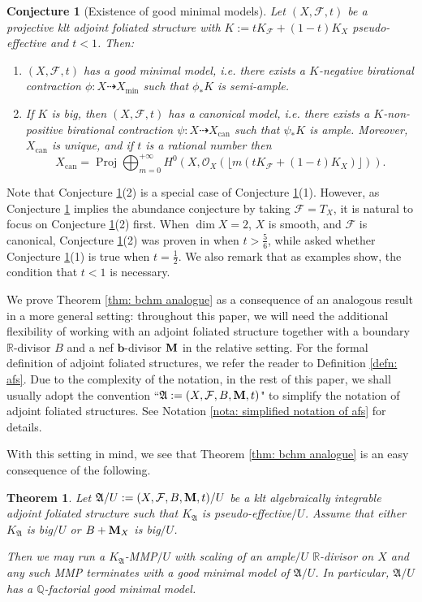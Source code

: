 \documentclass[12pt]{amsart}
\numberwithin{equation}{section}
\newcommand{\bb}{\bm{b}}
\newcommand{\Mm}{{\bf{M}}}
\newcommand{\Rr}{\mathbb{R}}
\newcommand{\Proj}{{\operatorname{Proj}}}
\newcommand{\can}{{\operatorname{can}}}
\newcommand{\Aa}{{\mathfrak{A}}}
\newcommand{\Ff}{\mathcal{F}}
\newtheorem{thmsub}{Theorem}[subsection]
\newtheorem{conj}[thm]{Conjecture}
\theoremstyle{definition}
\theoremstyle{definition}
\theoremstyle{definition}
\begin{document}
\begin{conj}[Existence of good minimal models]\label{conj: eogmm afs}
    Let $(X,\Ff,t)$ be a projective klt adjoint foliated structure with $K:=tK_{\Ff}+(1-t)K_X$ pseudo-effective and $t<1$.
    Then:
    \begin{enumerate}
        \item $(X,\Ff,t)$ has a good minimal model, i.e. there exists a $K$-negative birational contraction $\phi\colon X\dashrightarrow X_{\min}$ such that $\phi_*K$ is semi-ample.
        \item If $K$ is big, then $(X,\Ff,t)$ has a canonical model, i.e. there exists a $K$-non-positive birational contraction $\psi\colon X\dashrightarrow X_{\can}$ such that $\psi_*K$ is ample. Moreover, $X_{\can}$ is unique, and if $t$ is a rational number then $$X_{\can}=\Proj\bigoplus_{m=0}^{+\infty}H^0(X,\mathcal O_X(\lfloor m(tK_{\Ff}+(1-t)K_X)\rfloor)).$$
    \end{enumerate}
\end{conj}
Note that Conjecture \ref{conj: eogmm afs}(2) is a special case of Conjecture \ref{conj: eogmm afs}(1). However, as Conjecture \ref{conj: eogmm afs} implies the abundance conjecture by taking $\Ff=T_X$, it is natural to focus on Conjecture \ref{conj: eogmm afs}(2) first. When $\dim X=2$, $X$ is smooth, and $\Ff$ is canonical, Conjecture \ref{conj: eogmm afs}(2) was proven in \cite[Theorem 1.2]{SS23} when $t>\frac{5}{6}$, while \cite[Problem 1.9]{LW24} asked whether Conjecture \ref{conj: eogmm afs}(1) is true when $t=\frac{1}{2}$.  We also remark that as examples show, the condition that $t<1$ is necessary. 


We prove Theorem \ref{thm: bchm analogue} as a consequence of an analogous result in a more general setting:
throughout this paper, we will need the additional flexibility of working with an adjoint foliated structure together with a boundary $\Rr$-divisor $B$ and a nef $\bb$-divisor $\Mm$ in the relative setting. For the formal definition of adjoint foliated structures, we refer the reader to Definition \ref{defn: afs}. Due to the complexity of the notation, in the rest of this paper, we shall usually adopt the convention ``$\Aa:=(X,\Ff,B,\Mm,t)$" to simplify the notation of adjoint foliated structures. See Notation \ref{nota: simplified notation of afs} for details.


With this setting in mind, we see that Theorem \ref{thm: bchm analogue} is an easy consequence of the following.

\begin{thmsub}\label{thm: eogmm ai afs general case}
    Let $\Aa/U:=(X,\Ff,B,\Mm,t)/U$ be a klt algebraically integrable adjoint foliated structure such that $K_{\Aa}$ is pseudo-effective$/U$. Assume that either $K_{\Aa}$ is big$/U$ or $B+\Mm_X$ is big$/U$.
    
    Then we may run a $K_{\Aa}$-MMP$/U$ with scaling of an ample$/U$ $\Rr$-divisor on $X$ and any such MMP terminates with a good minimal model of $\Aa/U$. In particular, $\Aa/U$ has a $\mathbb Q$-factorial good minimal model.
\end{thmsub}
\end{document}
